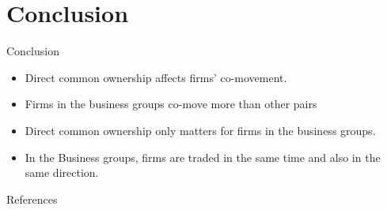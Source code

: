 \documentclass[handout]{beamer}
\begin{document}
	
	\section{Conclusion}
	
	\begin{frame}{Conclusion}
		\begin{itemize}
			
			
			
			\item Direct common ownership affects firms' co-movement.
			\item 
			Firms in the business groups co-move more than other pairs
			\item Direct common ownership only matters for firms in the business groups.
			\item In the Business groups, firms are traded in the same time and also in the same direction.
			
		\end{itemize}
	\end{frame}
	

	
	
	\color{black}
	\appendix
	
	\tiny
	\begin{frame}[allowframebreaks]{References}
		
		{		
			
			
		}
	\end{frame}
	
	\normalsize	
	
	
	
	
\end{document}
